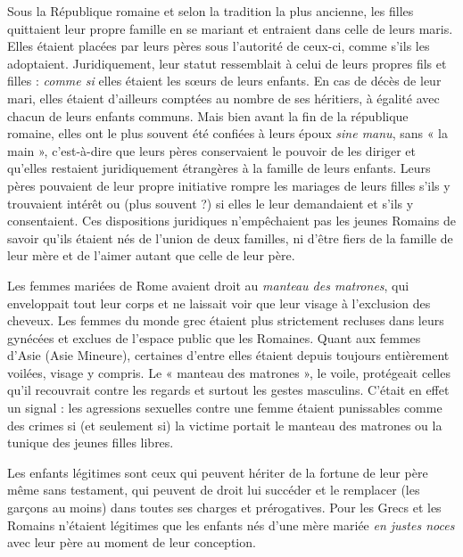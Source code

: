 Sous la République romaine et selon la tradition la plus ancienne,
les filles quittaient leur propre famille en se mariant et entraient dans celle
de leurs maris. Elles étaient placées par leurs pères sous l'autorité de
ceux-ci, comme s'ils les adoptaient. Juridiquement, leur statut ressemblait
à celui de leurs propres fils et filles : \emph{comme si} elles étaient les sœurs de
leurs enfants. En cas de décès de leur mari, elles étaient d'ailleurs comptées
au nombre de ses héritiers, à égalité avec chacun de leurs enfants
communs. Mais bien avant la fin de la république romaine, elles ont le
plus souvent été confiées à leurs époux \emph{sine manu}, sans « la main », c'est-à-dire
que leurs pères conservaient le pouvoir de les diriger  et
qu'elles restaient juridiquement étrangères à la famille de leurs enfants.
Leurs pères pouvaient de leur propre initiative rompre les mariages de
leurs filles s'ils y trouvaient intérêt ou (plus souvent ?) si elles le leur demandaient
et s'ils y consentaient. Ces dispositions juridiques n'empêchaient
pas les jeunes Romains de savoir qu'ils étaient nés de l'union de
deux familles, ni d'être fiers de la famille de leur mère et de l'aimer autant
que celle de leur père.

Les femmes mariées de Rome avaient droit au \emph{manteau des matrones},
qui enveloppait tout leur corps et ne laissait voir que leur visage à l'exclusion
des cheveux. Les femmes du monde grec étaient plus strictement
recluses dans leurs gynécées et exclues de l'espace public que les Romaines.
Quant aux femmes d'Asie (Asie Mineure), certaines d'entre elles
étaient depuis toujours entièrement voilées, visage y compris. Le
« manteau des matrones », le voile, protégeait celles qu'il recouvrait
contre les regards et surtout les gestes masculins. C'était en effet un signal :
les agressions sexuelles contre une femme étaient punissables
comme des crimes si (et seulement si) la victime portait le manteau des
matrones ou la tunique des jeunes filles libres.

Les enfants légitimes sont ceux qui peuvent hériter de la fortune
de leur père même sans testament, qui peuvent de droit lui succéder et le
remplacer (les garçons au moins) dans toutes ses charges et prérogatives.
Pour les Grecs et les Romains n'étaient légitimes que les enfants nés d'une
mère mariée \emph{en justes noces} avec leur père au moment de leur conception.

